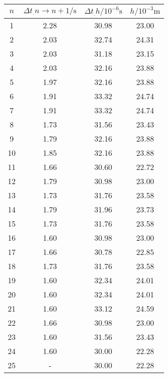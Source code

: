 \label{tab:tabTMScan}
	\begin{tabular}{S[table-format=1.0]S[table-format=1.2]S[table-format=2.2]S[table-format=2.2]}
		\toprule
		{$n$} & {$\Delta t_.{n\rightarrow n+1}/\si{\second}$} &{$\Delta t_.{h}/10^{-6}\si{\second}$} & {$h/10^{-3}\si{\metre}$} \\
		 & 2.28 & 30.98 & 23.00 \\
		2 & 2.03 & 32.74 & 24.31 \\
		3 & 2.03 & 31.18 & 23.15 \\
		4 & 2.03 & 32.16 & 23.88 \\
		5 & 1.97 & 32.16 & 23.88 \\
		6 & 1.91 & 33.32 & 24.74 \\
		7 & 1.91 & 33.32 & 24.74 \\
		8 & 1.73 & 31.56 & 23.43 \\
		9 & 1.79 & 32.16 & 23.88 \\
		10 & 1.85 & 32.16 & 23.88 \\
		11 & 1.66 & 30.60 & 22.72 \\
		12 & 1.79 & 30.98 & 23.00 \\
		13 & 1.73 & 31.76 & 23.58 \\
		14 & 1.79 & 31.96 & 23.73 \\
		15 & 1.73 & 31.76 & 23.58 \\
		16 & 1.60 & 30.98 & 23.00 \\
		17 & 1.66 & 30.78 & 22.85 \\
		18 & 1.73 & 31.76 & 23.58 \\
		19 & 1.60 & 32.34 & 24.01 \\
		20 & 1.60 & 32.34 & 24.01 \\
		21 & 1.60 & 33.12 & 24.59 \\
		22 & 1.66 & 30.98 & 23.00 \\
		23 & 1.60 & 31.56 & 23.43 \\
		24 & 1.60 & 30.00 & 22.28 \\
		25 & - & 30.00 & 22.28 \\
		\bottomrule
	\end{tabular}
